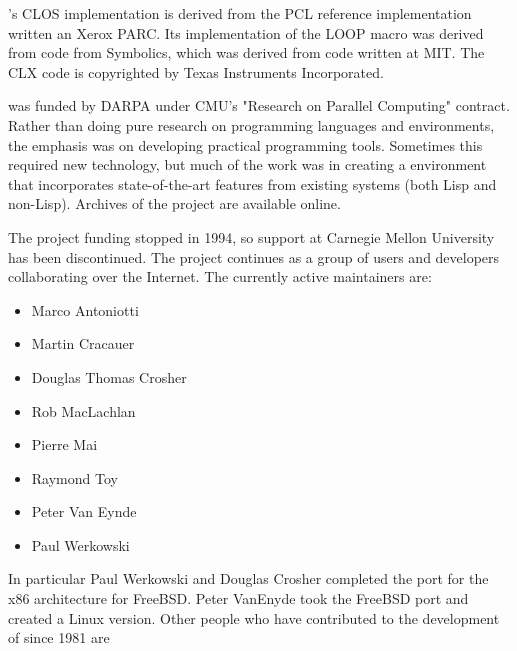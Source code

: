 \cmucl{}'s CLOS implementation is derived from the PCL reference
implementation written an Xerox PARC. Its implementation of the LOOP
macro was derived from code from Symbolics, which was derived from
code written at MIT. The CLX code is copyrighted by Texas Instruments
Incorporated.

\cmucl{} was funded by DARPA under CMU's "Research on Parallel Computing"
contract. Rather than doing pure research on programming languages and
environments, the emphasis was on developing practical programming
tools. Sometimes this required new technology, but much of the work
was in creating a \clisp{} environment that incorporates
state-of-the-art features from existing systems (both Lisp and
non-Lisp). Archives of the project are available online.

The project funding stopped in 1994, so support at Carnegie Mellon
University has been discontinued. The project continues as a group of
users and developers collaborating over the Internet. The currently
active maintainers are:

\begin{itemize}
\item Marco Antoniotti
\item Martin Cracauer
\item Douglas Thomas Crosher
\item Rob MacLachlan
\item Pierre Mai
\item Raymond Toy
\item Peter Van Eynde
\item Paul Werkowski
\end{itemize}

In particular Paul Werkowski and Douglas Crosher completed the port
for the x86 architecture for FreeBSD. Peter VanEnyde took the FreeBSD
port and created a Linux version. Other people who have contributed to
the development of \cmucl{} since 1981 are

